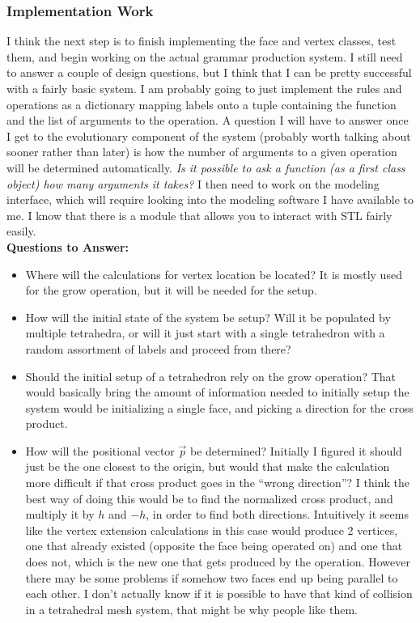 \documentclass[letterpaper,oneside,titlepage]{article}
\begin{document}
\subsubsection{Implementation Work}
I think the next step is to finish implementing the face and vertex classes, test them, and begin working on the actual grammar production system.  I still need to answer a couple of design questions, but I think that I can be pretty successful with a fairly basic system.  I am probably going to just implement the rules and operations as a dictionary mapping labels onto a tuple containing the function and the list of arguments to the operation.  A question I will have to answer once I get to the evolutionary component of the system (probably worth talking about sooner rather than later) is how the number of arguments to a given operation will be determined automatically.  \emph{Is it possible to ask a function (as a first class object) how many arguments it takes?}  I then need to work on the modeling interface, which will require looking into the modeling software I have available to me.  I know that there is a module that allows you to interact with STL fairly easily.
\\
\textbf{Questions to Answer:}
\\
\begin{itemize}
\item Where will the calculations for vertex location be located?  It is mostly used for the grow operation, but it will be needed for the setup.
\item How will the initial state of the system be setup?  Will it be populated by multiple tetrahedra, or will it just start with a single tetrahedron with a random assortment of labels and proceed from there?
\item Should the initial setup of a tetrahedron rely on the grow operation?  That would basically bring the amount of information needed to initially setup the system would be initializing a single face, and picking a direction for the cross product.
\item How will the positional vector $\vec{p}$ be determined?  Initially I figured it should just be the one closest to the origin, but would that make the calculation more difficult if that cross product goes in the ``wrong direction''?  I think the best way of doing this would be to find the normalized cross product, and multiply it by $h$ and $-h$, in order to find both directions.  Intuitively it seems like the vertex extension calculations in this case would produce 2 vertices, one that already existed (opposite the face being operated on) and one that does not, which is the new one that gets produced by the operation.  However there may be some problems if somehow two faces end up being parallel to each other.  I don't actually know if it is possible to have that kind of collision in a tetrahedral mesh system, that might be why people like them.
\end{itemize}
\end{document}
